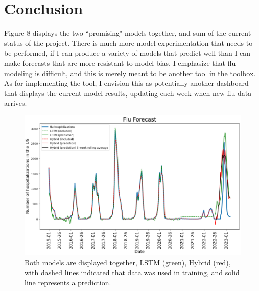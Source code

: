 \documentclass[12pt,a4paper,english]{article}
\begin{document}
\section{Conclusion}

Figure 8 displays the two ``promising" models together, and sum of the current status of the project. There is much more model experimentation that needs to be performed, if I can produce a variety of models that predict well than I can make forecasts that are more resistant to model bias. I emphasize that flu modeling is difficult, and this is merely meant to be another tool in the toolbox. As for implementing the tool, I envision this as potentially another dashboard that displays the current model results, updating each week when new flu data arrives.


	\begin{figure}[h!]
		\centering
		\includegraphics[scale=0.75]{Pictures/flu_models.png}
		\caption{Both models are displayed together, LSTM (green), Hybrid (red), with dashed lines indicated that data was used in training, and solid line represents a prediction.}
		\label{fig:flu_models}
	\end{figure}
\end{document}
